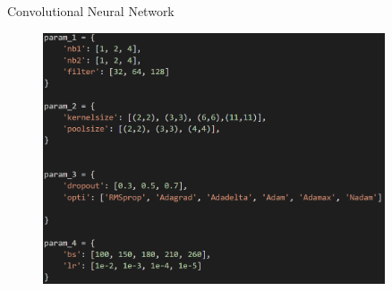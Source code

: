 \documentclass[aspectratio=1610, 9pt]{beamer}
\begin{document}
\begin{frame}{Convolutional Neural Network}
  \begin{figure}
    \centering
    \begin{minipage}{0.48\textwidth}
      \includegraphics[width=0.9\textwidth]{images/grid.png}
    \end{minipage}
  \end{figure}
\end{frame}
\end{document}
